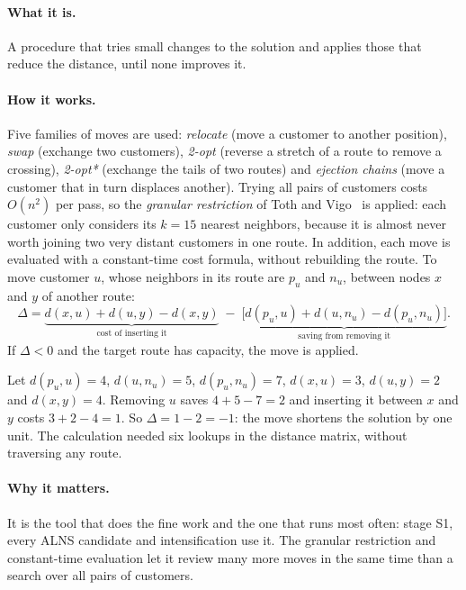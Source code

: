 \documentclass[11pt,a4paper]{article}
\begin{document}
\paragraph{What it is.} A procedure that tries small changes to the solution and applies those that
reduce the distance, until none improves it.

\paragraph{How it works.} Five families of moves are used: \emph{relocate} (move a customer to another
position), \emph{swap} (exchange two customers), \emph{2-opt} (reverse a stretch of a route to remove
a crossing), \emph{2-opt*} (exchange the tails of two routes) and \emph{ejection chains} (move a
customer that in turn displaces another). Trying all pairs of customers costs $O(n^2)$ per pass, so
the \emph{granular restriction} of Toth and Vigo~\cite{toth2003granular} is applied: each customer
only considers its $k=15$ nearest neighbors, because it is almost never worth joining two very
distant customers in one route. In addition, each move is evaluated with a constant-time cost
formula, without rebuilding the route. To move customer $u$, whose neighbors in its route are $p_u$
and $n_u$, between nodes $x$ and $y$ of another route:
\begin{equation}
\Delta = \underbrace{d(x,u)+d(u,y)-d(x,y)}_{\text{cost of inserting it}}\;-\;
\underbrace{\bigl[d(p_u,u)+d(u,n_u)-d(p_u,n_u)\bigr]}_{\text{saving from removing it}}.
\label{eq:relocate}
\end{equation}
If $\Delta<0$ and the target route has capacity, the move is applied.

\begin{ejemplo}
Let $d(p_u,u)=4$, $d(u,n_u)=5$, $d(p_u,n_u)=7$, $d(x,u)=3$, $d(u,y)=2$ and $d(x,y)=4$. Removing $u$
saves $4+5-7=2$ and inserting it between $x$ and $y$ costs $3+2-4=1$. So $\Delta=1-2=-1$: the move
shortens the solution by one unit. The calculation needed six lookups in the distance matrix,
without traversing any route.
\end{ejemplo}

\paragraph{Why it matters.} It is the tool that does the fine work and the one that runs most often:
stage S1, every ALNS candidate and intensification use it. The granular restriction and constant-time
evaluation let it review many more moves in the same time than a search over all pairs of
customers.
\end{document}
